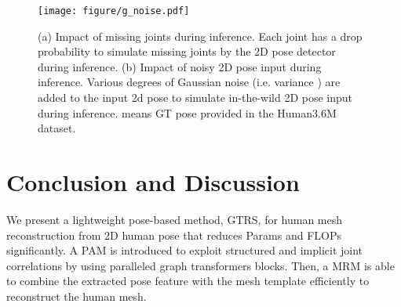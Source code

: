 \documentclass[sigconf]{acmart}
\begin{document}
\begin{table}[htp]
\tiny
\centering
  \caption{ Ablation study on different 2D pose input.}
\label{tab: Ab_noise}
\vspace{-10pt}
\end{table}

\begin{figure}[htp]
\vspace{-5pt}
  \centering
  \texttt{[image: figure/g\_noise.pdf]}
  \vspace{-15pt}
  \caption{(a) Impact of missing joints during inference. Each joint has a drop probability to simulate missing joints by the 2D pose detector during inference.  (b) Impact of noisy 2D pose input during inference. Various degrees of Gaussian noise (i.e. variance ) are added to the input 2d pose to simulate in-the-wild 2D pose input during inference.  means GT pose provided in the Human3.6M dataset.}
  \vspace{-5pt}
  \label{fig:g_noise}
  \vspace{-5pt}
\end{figure}


\section{Conclusion and Discussion}
We present a lightweight pose-based method, GTRS, for human mesh reconstruction from 2D human pose that reduces Params and FLOPs significantly. A PAM is introduced to exploit structured and implicit joint correlations by using paralleled graph transformers blocks. Then, a MRM is able to combine the extracted pose feature with the mesh template efficiently to reconstruct the human mesh.
\end{document}
